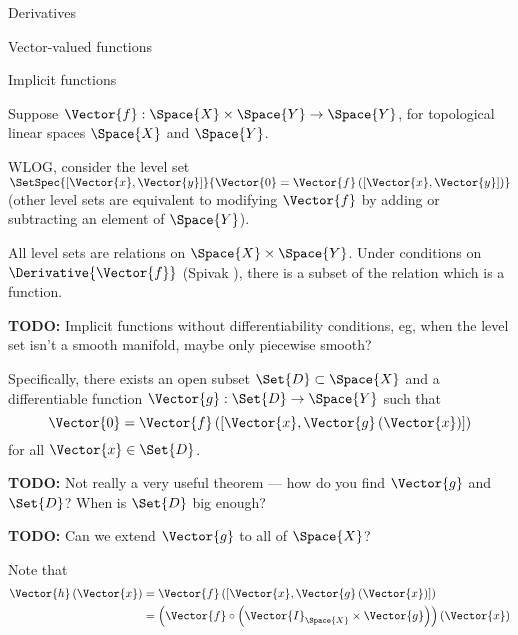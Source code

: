 \begin{plSection}{Derivatives}
\begin{plSection}{Vector-valued functions}
\begin{plSection}{Implicit functions}
\label{sec:Derivatives-of-implicit-functions}

Suppose 
$\Vector{f} : \Space{X} \times \Space{Y} \rightarrow \Space{Y}$,
for topological linear spaces $\Space{X}$ and $\Space{Y}$.

WLOG, consider the level set 
$\SetSpec{\left[ \Vector{x} , \Vector{y} \right]}
{\Vector{0} = \Vector{f}\left( \left[ \Vector{x} , \Vector{y} \right] \right)}$
(other level sets are equivalent to modifying $\Vector{f}$
by adding or subtracting 
an element of $\Space{Y}$).

All level sets are relations on $\Space{X} \times \Space{Y}$.
Under conditions on $\Derivative{\Vector{f}}$
(Spivak \cite[Theorem~2-12]{Spivak:1965:CalculusOnManifolds}),
there is a subset of the relation which is a 
function.

\textbf{TODO:} Implicit functions without differentiability
conditions, eg, when the level set isn't a smooth manifold,
maybe only piecewise smooth?

Specifically, 
there exists an open subset $\Set{D}  \subset \Space{X}$
and a differentiable function $\Vector{g} : \Set{D} \rightarrow \Space{Y}$
such that 
\begin{equation}\label{eq:Implicit-function}
\Vector{0} = \Vector{f}\left( \left[ \Vector{x} , \Vector{g} \left( \Vector{x} \right) \right] \right)
\end{equation}
for all 
$\Vector{x} \in  \Set{D}$.

\textbf{TODO:} Not really a very useful theorem --- 
how do you find $\Vector{g}$ and $\Set{D}$?
When is $\Set{D}$ big enough?

\textbf{TODO:} Can we extend $\Vector{g}$ to all of $\Space{X}$?

Note that 
\begin{equation}
\begin{aligned}
\Vector{h}\left(\Vector{x}\right) 
& = 
\Vector{f}\left( \left[ \Vector{x} , \Vector{g} \left( \Vector{x} \right) \right] \right)
\\
& =
\left( \Vector{f} \circ \left( \Vector{I}_{\Space{X}} \times \Vector{g} \right) \right) 
\left( \Vector{x} \right)
\end{aligned} 
\end{equation}


\end{plSection}
\end{plSection}
\end{plSection}
